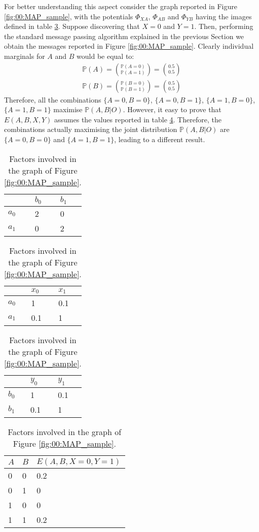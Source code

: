 For better understanding this aspect consider the graph reported in Figure \ref{fig:00:MAP_sample}, with the potentials $\Phi _{XA}$, $\Phi _{AB}$ and $\Phi _{YB}$ having the images defined in table \ref{tab:00:t3}.
Suppose discovering that $X=0$ and $Y=1$. Then, performing the standard message passing algorithm explained in the previous Section we obtain the messages reported in Figure \ref{fig:00:MAP_sample}. Clearly individual marginals for $A$ and $B$ would be equal to:
\begin{eqnarray}
\mathbb{P}(A)= \binom{\mathbb{P}(A=0)}{\mathbb{P}(A=1)} = \binom{0.5}{0.5} \nonumber\\
\mathbb{P}(B)= \binom{\mathbb{P}(B=0)}{\mathbb{P}(B=1)} = \binom{0.5}{0.5}
\end{eqnarray}
Therefore, all the combinations $\lbrace A=0, B=0 \rbrace$, $\lbrace A=0, B=1 \rbrace$, $\lbrace A=1, B=0 \rbrace$, $\lbrace A=1, B=1 \rbrace$ maximise $\mathbb{P}(A,B | O)$. However, it easy to prove that $E(A,B,X,Y)$ assumes the values reported in table \ref{tab:00:t4}.
Therefore, the combinations actually maximising the joint distribution $\mathbb{P}(A,B | O)$ are $\lbrace A=0, B=0 \rbrace$ and $\lbrace A=1, B=1 \rbrace$, leading to a different result.

\begin{table}[]
\centering
\begin{tabular}{l|l|l|}
      & $b_0$ & $b_1$ \\
      \hline
$a_0$ & 2     & 0  \\
\hline
$a_1$ & 0     & 2  \\
\hline 
\end{tabular}
\quad
\begin{tabular}{l|l|l|}
      & $x_0$ & $x_1$ \\
      \hline
$a_0$ & 1     & 0.1  \\
\hline
$a_1$ & 0.1   & 1  \\
\hline 
\end{tabular}
\quad
\begin{tabular}{l|l|l|}
      & $y_0$ & $y_1$ \\
      \hline
$b_0$ & 1     & 0.1  \\
\hline
$b_1$ & 0.1   & 1  \\
\hline 
\end{tabular}
\caption{Factors involved in the graph of Figure \ref{fig:00:MAP_sample}.} 
\label{tab:00:t3}
\end{table}

\begin{table}[]
\centering
\begin{tabular}{|l|l|l|}
$A$ & $B$ & $E(A,B,X=0,Y=1)$ \\
\hline
0 & 0 & 0.2 \\
\hline
0 & 1 & 0 \\
\hline
1 & 0 & 0 \\
\hline
1 & 1 & 0.2 \\
\hline
\end{tabular}
\caption{Factors involved in the graph of Figure \ref{fig:00:MAP_sample}.} 
\label{tab:00:t4}
\end{table}

